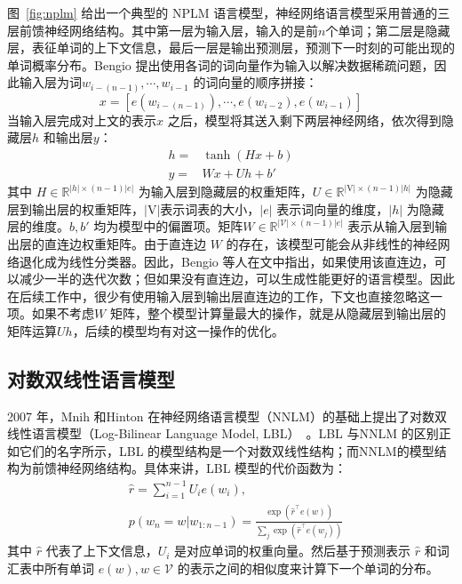 图~\ref{fig:nplm} 给出一个典型的 NPLM 语言模型，神经网络语言模型采用普通的三层前馈神经网络结构。其中第一层为输入层，输入的是前$n$个单词；第二层是隐藏层，表征单词的上下文信息，最后一层是输出预测层，预测下一时刻的可能出现的单词概率分布。Bengio 提出使用各词的词向量作为输入以解决数据稀疏问题，因此输入层为词$w_{i-(n-1)}, \cdots,w_{i-1} $ 的词向量的顺序拼接：
\begin{equation}\label{equ:we}
  x = [e(w_{i-(n-1)}), \cdots , e(w_{i-2}), e{(w_{i-1})}]
\end{equation}
当输入层完成对上文的表示$x$ 之后，模型将其送入剩下两层神经网络，依次得到隐藏层$h$ 和输出层$y$：
\begin{equation}\label{equ:nplm}
\begin{split}
h =& \tanh(Hx+b) \\
y =&Wx + Uh +b'
\end{split}
\end{equation}
其中 $H \in \mathbb{R}^{|h| \times (n-1)|e|}$ 为输入层到隐藏层的权重矩阵，$U \in \mathbb{R}^{|\mathrm{V}|\times (n-1)|h|}$ 为隐藏层到输出层的权重矩阵，$ |\mathrm{V}|$表示词表的大小，$|e|$ 表示词向量的维度，$|h|$ 为隐藏层的维度。$b,b'$ 均为模型中的偏置项。矩阵$W \in \mathbb{R}^{|\mathcal{V}|\times (n-1)|e|}$ 表示从输入层到输出层的直连边权重矩阵。由于直连边 $W$ 的存在，该模型可能会从非线性的神经网络退化成为线性分类器。因此，Bengio 等人在文中指出，如果使用该直连边，可以减少一半的迭代次数；但如果没有直连边，可以生成性能更好的语言模型。因此在后续工作中，很少有使用输入层到输出层直连边的工作，下文也直接忽略这一项。如果不考虑$W$ 矩阵，整个模型计算量最大的操作，就是从隐藏层到输出层的矩阵运算$Uh$，后续的模型均有对这一操作的优化。

\subsection{对数双线性语言模型}
2007 年，Mnih 和Hinton 在神经网络语言模型（NNLM）的基础上提出了对数双线性语言模型（Log-Bilinear Language Model, LBL）~。LBL 与NNLM 的区别正如它们的名字所示，LBL 的模型结构是一个对数双线性结构；而NNLM的模型结构为前馈神经网络结构。具体来讲，LBL 模型的代价函数为：
\begin{equation}
\label{equ:lbl}
\begin{split}
   &\hat r=\sum_{i=1}^{n-1}{U_i e({w_i})}, \\
   &p(w_n=w|w_{1:n-1})=\frac{\exp(\hat r^\top e(w))}{\sum_j{\exp(\hat r^\top e(w_j))}}
\end{split}
\end{equation}
其中 $\hat r$ 代表了上下文信息，$U_i$ 是对应单词的权重向量。然后基于预测表示 $\hat r$ 和词汇表中所有单词 $e(w),w\in \mathcal{V}$ 的表示之间的相似度来计算下一个单词的分布。

